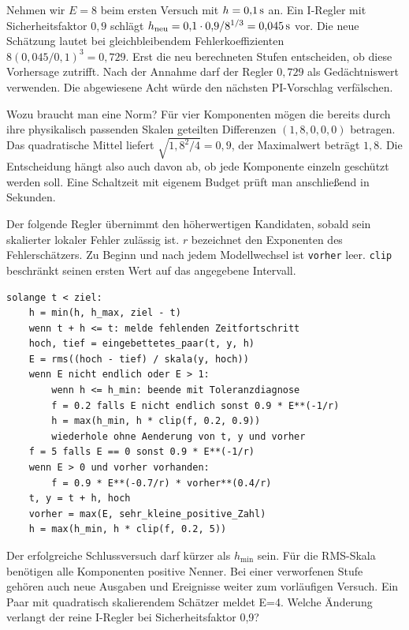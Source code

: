 Nehmen wir \(E=8\) beim ersten Versuch mit \(h=0{,}1\,\mathrm{s}\) an. Ein I-Regler mit Sicherheitsfaktor \(0{,}9\) schlägt \(h_{\rm neu}=0{,}1\cdot0{,}9/8^{1/3}=0{,}045\,\mathrm{s}\) vor. Die neue Schätzung lautet bei gleichbleibendem Fehlerkoeffizienten \(8(0{,}045/0{,}1)^3=0{,}729\). Erst die neu berechneten Stufen entscheiden, ob diese Vorhersage zutrifft. Nach der Annahme darf der Regler \(0{,}729\) als Gedächtniswert verwenden. Die abgewiesene Acht würde den nächsten PI-Vorschlag verfälschen.

Wozu braucht man eine Norm? Für vier Komponenten mögen die bereits durch ihre physikalisch passenden Skalen geteilten Differenzen \((1{,}8,0,0,0)\) betragen. Das quadratische Mittel liefert \(\sqrt{1{,}8^2/4}=0{,}9\), der Maximalwert beträgt \(1{,}8\). Die Entscheidung hängt also auch davon ab, ob jede Komponente einzeln geschützt werden soll. Eine Schaltzeit mit eigenem Budget prüft man anschließend in Sekunden.


Der folgende Regler übernimmt den höherwertigen Kandidaten, sobald sein skalierter lokaler Fehler zulässig ist. \(r\) bezeichnet den Exponenten des Fehlerschätzers. Zu Beginn und nach jedem Modellwechsel ist \texttt{vorher} leer. \texttt{clip} beschränkt seinen ersten Wert auf das angegebene Intervall.
{\small\begin{verbatim}
solange t < ziel:
    h = min(h, h_max, ziel - t)
    wenn t + h <= t: melde fehlenden Zeitfortschritt
    hoch, tief = eingebettetes_paar(t, y, h)
    E = rms((hoch - tief) / skala(y, hoch))
    wenn E nicht endlich oder E > 1:
        wenn h <= h_min: beende mit Toleranzdiagnose
        f = 0.2 falls E nicht endlich sonst 0.9 * E**(-1/r)
        h = max(h_min, h * clip(f, 0.2, 0.9))
        wiederhole ohne Aenderung von t, y und vorher
    f = 5 falls E == 0 sonst 0.9 * E**(-1/r)
    wenn E > 0 und vorher vorhanden:
        f = 0.9 * E**(-0.7/r) * vorher**(0.4/r)
    t, y = t + h, hoch
    vorher = max(E, sehr_kleine_positive_Zahl)
    h = max(h_min, h * clip(f, 0.2, 5))
\end{verbatim}}
Der erfolgreiche Schlussversuch darf kürzer als \(h_{\min}\) sein. Für die RMS-Skala benötigen alle Komponenten positive Nenner. Bei einer verworfenen Stufe gehören auch neue Ausgaben und Ereignisse weiter zum vorläufigen Versuch.
Ein Paar mit quadratisch skalierendem Schätzer meldet E=4. Welche Änderung verlangt der reine I-Regler bei Sicherheitsfaktor 0,9?
